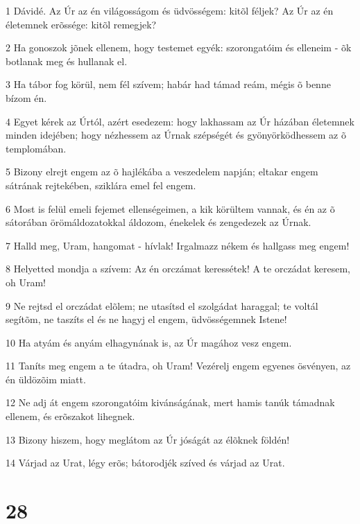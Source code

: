 \par 1 Dávidé. Az Úr az én világosságom és üdvösségem: kitõl féljek? Az Úr az én életemnek erõssége: kitõl remegjek?
\par 2 Ha gonoszok jõnek ellenem, hogy testemet egyék: szorongatóim és elleneim - õk botlanak meg és hullanak el.
\par 3 Ha tábor fog körül, nem fél szívem; habár had támad reám, mégis õ benne bízom én.
\par 4 Egyet kérek az Úrtól, azért esedezem: hogy lakhassam az Úr házában életemnek minden idejében; hogy nézhessem az Úrnak szépségét és gyönyörködhessem az õ templomában.
\par 5 Bizony elrejt engem az õ hajlékába a veszedelem napján; eltakar engem sátrának rejtekében, sziklára emel fel engem.
\par 6 Most is felül emeli fejemet ellenségeimen, a kik körültem vannak, és én az õ sátorában örömáldozatokkal áldozom, énekelek és zengedezek az Úrnak.
\par 7 Halld meg, Uram, hangomat - hívlak! Irgalmazz nékem és hallgass meg engem!
\par 8 Helyetted mondja a szívem: Az én orczámat keressétek! A te orczádat keresem, oh Uram!
\par 9 Ne rejtsd el orczádat elõlem; ne utasítsd el szolgádat haraggal; te voltál segítõm, ne taszíts el és ne hagyj el engem, üdvösségemnek Istene!
\par 10 Ha atyám és anyám elhagynának is, az Úr magához vesz engem.
\par 11 Taníts meg engem a te útadra, oh Uram! Vezérelj engem egyenes ösvényen, az én üldözõim miatt.
\par 12 Ne adj át engem szorongatóim kivánságának, mert hamis tanúk támadnak ellenem, és erõszakot lihegnek.
\par 13 Bizony hiszem, hogy meglátom az Úr jóságát az élõknek földén!
\par 14 Várjad az Urat, légy erõs; bátorodjék szíved és várjad az Urat.

\chapter{28}

